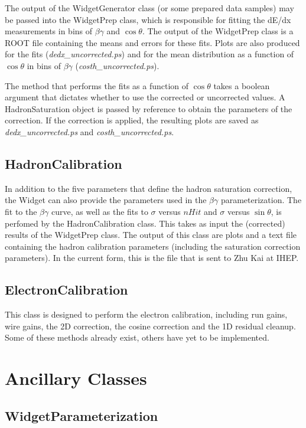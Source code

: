 \documentclass{article}
\begin{document}
The output of the WidgetGenerator class (or some prepared data samples) may be passed into the 
WidgetPrep class, which is responsible for fitting the dE/dx measurements in bins of $\beta\gamma$ 
and $\cos{\theta}$. The output of the WidgetPrep class is a ROOT file containing the means and 
errors for these fits. Plots are also produced for the fits (\textit{dedx\_uncorrected.ps}) and 
for the mean distribution as a function of $\cos{\theta}$ in bins of $\beta\gamma$ 
(\textit{costh\_uncorrected.ps}).

The method that performs the fits as a function of $\cos{\theta}$ takes a boolean argument that
dictates whether to use the corrected or uncorrected values. A HadronSaturation object is passed
by reference to obtain the parameters of the correction. If the correction is applied, the
resulting plots are saved as \textit{dedx\_uncorrected.ps} and \textit{costh\_uncorrected.ps}.

\subsection{HadronCalibration}

In addition to the five parameters that define the hadron saturation correction, the Widget can
also provide the parameters used in the $\beta\gamma$ parameterization. The fit to the 
$\beta\gamma$ curve, as well as the fits to $\sigma$ versus $nHit$ and $\sigma$ versus 
$\sin{\theta}$, is perfomed by the HadronCalibration class. This takes as input the (corrected)
results of the WidgetPrep class. The output of this class are plots and a text file containing
the hadron calibration parameters (including the saturation correction parameters). In the
current form, this is the file that is sent to Zhu Kai at IHEP.

\subsection{ElectronCalibration}

This class is designed to perform the electron calibration, including run gains, wire gains,
the 2D correction, the cosine correction and the 1D residual cleanup. Some of these methods already
exist, others have yet to be implemented.

\section{Ancillary Classes}

\subsection{WidgetParameterization}
\end{document}
